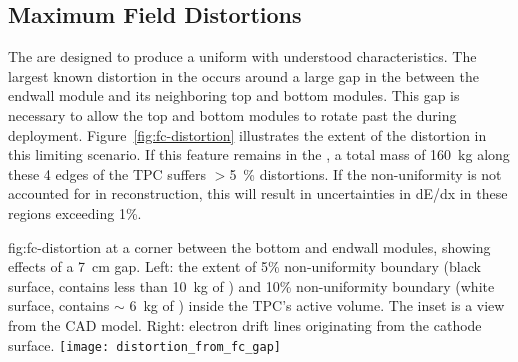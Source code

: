 
\subsection{Maximum Field Distortions}

The  are designed to produce a uniform \efield with understood characteristics.
The largest known \efield distortion in the  occurs around a large gap in the  between the endwall module and its neighboring top and bottom modules. This gap is necessary to allow the top and bottom modules to rotate past the  during deployment.  Figure~\ref{fig:fc-distortion} illustrates the extent of the distortion in this limiting scenario. 
If this feature remains in the , a total \lar mass of \SI{160}{kg} along these 4 edges of the TPC suffers $>$\SI{5}{\%} \efield distortions.  If the non-uniformity is not accounted for in reconstruction, this will result in uncertainties in dE/dx in these regions exceeding 1\%. 

\begin{dunefigure}
{fig:fc-distortion}
{\efield at a corner between the bottom and endwall  modules, showing effects of a \SI{7}{cm} gap. Left: the extent of \num{5}\% \efield{} non-uniformity boundary (black surface, contains less than \SI{10}{kg} of \lar) and \num{10}\% non-uniformity boundary (white surface, contains $\sim$ \SI{6}{kg} of \lar) inside the TPC's active volume. The inset is a view from the CAD model.  Right: electron drift lines originating from the cathode surface.}
\texttt{[image: distortion\_from\_fc\_gap]}
\end{dunefigure}



